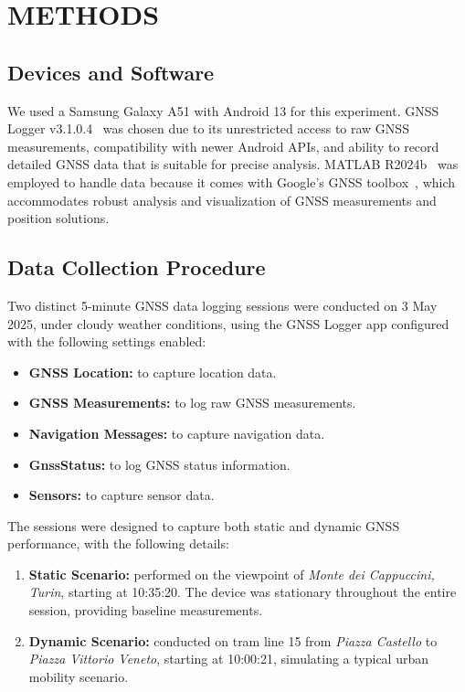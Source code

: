 
\section{METHODS} \label{sec:methods}

    \subsection{Devices and Software}
    
        We used a Samsung Galaxy A51 with Android 13 for this experiment.
        GNSS Logger v3.1.0.4~\cite{GNSSLogger2025} was chosen due to its unrestricted access to raw GNSS measurements, compatibility with newer Android APIs, and ability to record detailed GNSS data that is suitable for precise analysis.
        MATLAB R2024b~\cite{MATLAB2024b} was employed to handle data because it comes with Google's GNSS toolbox~\cite{GnssAnalysisTools2025}, which accommodates robust analysis and visualization of GNSS measurements and position solutions.
        
    \subsection{Data Collection Procedure}
    
        Two distinct 5-minute GNSS data logging sessions were conducted on 3 May 2025, under cloudy weather conditions, using the GNSS Logger app configured with the following settings enabled:

        \begin{itemize}
            \item \textbf{GNSS Location:} to capture location data.
            \item \textbf{GNSS Measurements:} to log raw GNSS measurements.
            \item \textbf{Navigation Messages:} to capture navigation data.
            \item \textbf{GnssStatus:} to log GNSS status information.
            \item \textbf{Sensors:} to capture sensor data.
        \end{itemize}
        
        \noindent The sessions were designed to capture both static and dynamic GNSS performance, with the following details:

        \begin{enumerate}[label=\alph*)]
            \item \textbf{Static Scenario:} performed on the viewpoint of \textit{Monte dei Cappuccini, Turin}, starting at 10:35:20. The device was stationary throughout the entire session, providing baseline measurements.
            \item \textbf{Dynamic Scenario:} conducted on tram line 15 from \textit{Piazza Castello} to \textit{Piazza Vittorio Veneto}, starting at 10:00:21, simulating a typical urban mobility scenario.
        \end{enumerate}

